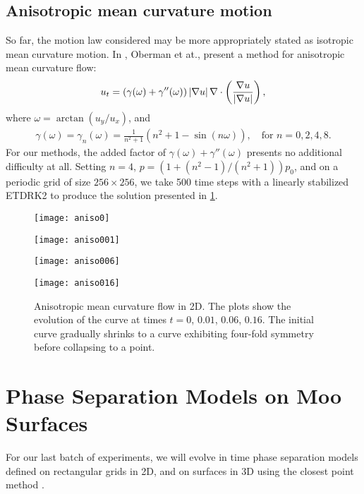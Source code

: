 \subsection{Anisotropic mean curvature motion}
So far, the motion law considered may be more appropriately stated as isotropic mean curvature motion. In \cite{oberman2011aniso}, Oberman et at., present a method for anisotropic mean curvature flow: 
\begin{align}
        u_t = (\gamma(\omega) + \gamma''(\omega))\left|\nabla u\right| \nabla \cdot \left( \frac{\nabla u}{\left|\nabla u\right|} \right),
\end{align}
where $\omega = \arctan(u_y/u_x)$, and 
\begin{align}
        \gamma(\omega) 
= \gamma_n(\omega) 
= \frac{1}{n^2+1}(n^2 + 1 - \sin(n\omega)), 
\quad\text{for } n = 0,2,4,8.
\end{align}
For our methods, the added factor of $\gamma(\omega) + \gamma''(\omega)$ presents no additional difficulty at all. Setting $n=4$, $p=(1+(n^2-1)/(n^2+1))p_0$, and on a periodic grid of size $256\times 256$, we take 500 time steps with a linearly stabilized ETDRK2 to produce the solution presented in \cref{fig:aniso mcm}. 
\begin{figure}
        \centering
\begin{minipage}{0.44\textwidth}
       \texttt{[image: aniso0]}
\end{minipage}
\begin{minipage}{0.44\textwidth}
       \texttt{[image: aniso001]}
\end{minipage}
\begin{minipage}{0.44\textwidth}
       \texttt{[image: aniso006]}
\end{minipage}
\begin{minipage}{0.44\textwidth}
       \texttt{[image: aniso016]}
\end{minipage}
\caption[Anisotropic mean curvature flow.]{Anisotropic mean curvature flow in 2D. The plots show the evolution of the curve at times $t=0$, $0.01$, $0.06$, $0.16$. The initial curve gradually shrinks to a curve exhibiting four-fold symmetry before collapsing to a point.}
\label{fig:aniso mcm}
\end{figure}

\section{Phase Separation Models on Moo Surfaces}
For our last batch of experiments, we will evolve in time phase separation models defined on rectangular grids in 2D, and on surfaces in 3D using the closest point method \cite{ruuth2008simple,macdonald2009implicit}.

